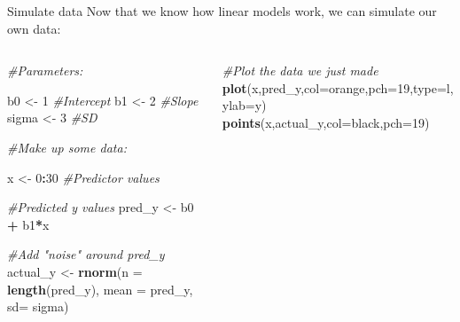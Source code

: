 \documentclass[
  ignorenonframetext,
  aspectratio=169]{beamer}
\newenvironment{Shaded}{\begin{snugshade}}{\end{snugshade}}
\newcommand{\AttributeTok}[1]{\textcolor[rgb]{0.13,0.29,0.53}{#1}}
\newcommand{\CommentTok}[1]{\textcolor[rgb]{0.56,0.35,0.01}{\textit{#1}}}
\newcommand{\DecValTok}[1]{\textcolor[rgb]{0.00,0.00,0.81}{#1}}
\newcommand{\FunctionTok}[1]{\textcolor[rgb]{0.13,0.29,0.53}{\textbf{#1}}}
\newcommand{\NormalTok}[1]{#1}
\newcommand{\OtherTok}[1]{\textcolor[rgb]{0.56,0.35,0.01}{#1}}
\newcommand{\SpecialCharTok}[1]{\textcolor[rgb]{0.81,0.36,0.00}{\textbf{#1}}}
\newcommand{\StringTok}[1]{\textcolor[rgb]{0.31,0.60,0.02}{#1}}
\let\oldShaded\Shaded %
\let\endoldShaded\endShaded
\renewenvironment{Shaded}{\scriptsize\oldShaded}{\endoldShaded}
\begin{document}
\begin{frame}[fragile]{Simulate data}
\protect\hypertarget{simulate-data}{}
Now that we know how linear models work, we can simulate our own data:

\begin{columns}[T]
\begin{column}{0.5\textwidth}
\scriptsize

\begin{Shaded}
\begin{Highlighting}[]
\CommentTok{\#Parameters:}

\NormalTok{b0 }\OtherTok{\textless{}{-}} \DecValTok{1} \CommentTok{\#Intercept}
\NormalTok{b1 }\OtherTok{\textless{}{-}} \DecValTok{2} \CommentTok{\#Slope }
\NormalTok{sigma }\OtherTok{\textless{}{-}} \DecValTok{3} \CommentTok{\#SD}

\CommentTok{\#Make up some data:}

\NormalTok{x }\OtherTok{\textless{}{-}} \DecValTok{0}\SpecialCharTok{:}\DecValTok{30} \CommentTok{\#Predictor values}

\CommentTok{\#Predicted y values}
\NormalTok{pred\_y }\OtherTok{\textless{}{-}}\NormalTok{ b0 }\SpecialCharTok{+}\NormalTok{ b1}\SpecialCharTok{*}\NormalTok{x }

\CommentTok{\#Add "noise" around pred\_y}
\NormalTok{actual\_y }\OtherTok{\textless{}{-}} \FunctionTok{rnorm}\NormalTok{(}\AttributeTok{n =} \FunctionTok{length}\NormalTok{(pred\_y),}
                  \AttributeTok{mean =}\NormalTok{ pred\_y,}
                  \AttributeTok{sd=}\NormalTok{ sigma)}
\end{Highlighting}
\end{Shaded}
\end{column}

\begin{column}{0.5\textwidth}
\scriptsize

\begin{Shaded}
\begin{Highlighting}[]
\CommentTok{\#Plot the data we just made}
\FunctionTok{plot}\NormalTok{(x,pred\_y,}\AttributeTok{col=}\StringTok{\textquotesingle{}orange\textquotesingle{}}\NormalTok{,}\AttributeTok{pch=}\DecValTok{19}\NormalTok{,}\AttributeTok{type=}\StringTok{\textquotesingle{}l\textquotesingle{}}\NormalTok{,}
     \AttributeTok{ylab=}\StringTok{\textquotesingle{}y\textquotesingle{}}\NormalTok{) }
\FunctionTok{points}\NormalTok{(x,actual\_y,}\AttributeTok{col=}\StringTok{\textquotesingle{}black\textquotesingle{}}\NormalTok{,}\AttributeTok{pch=}\DecValTok{19}\NormalTok{)}
\end{Highlighting}
\end{Shaded}


\end{column}
\end{columns}
\end{frame}
\end{document}
